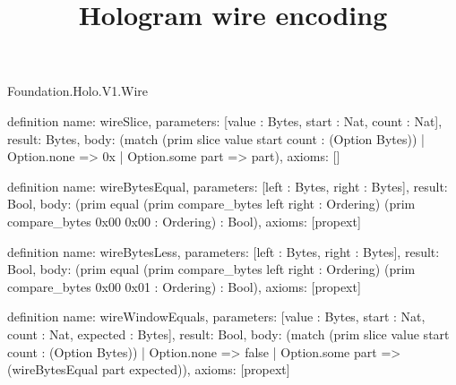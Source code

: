 \begin{lexlean}{Foundation.Holo.V1.Wire}
\title{Hologram wire encoding}
\begin{semanticmodule}
definition{
  name: wireSlice,
  parameters: [value : Bytes, start : Nat, count : Nat],
  result: Bytes,
  body: (match (prim slice value start count : (Option Bytes))
    | Option.none => 0x
    | Option.some part => part),
  axioms: []
}

definition{
  name: wireBytesEqual,
  parameters: [left : Bytes, right : Bytes],
  result: Bool,
  body: (prim equal (prim compare_bytes left right : Ordering) (prim compare_bytes 0x00 0x00 : Ordering) : Bool),
  axioms: [propext]
}

definition{
  name: wireBytesLess,
  parameters: [left : Bytes, right : Bytes],
  result: Bool,
  body: (prim equal (prim compare_bytes left right : Ordering) (prim compare_bytes 0x00 0x01 : Ordering) : Bool),
  axioms: [propext]
}

definition{
  name: wireWindowEquals,
  parameters: [value : Bytes, start : Nat, count : Nat, expected : Bytes],
  result: Bool,
  body: (match (prim slice value start count : (Option Bytes))
    | Option.none => false
    | Option.some part => (wireBytesEqual part expected)),
  axioms: [propext]
}


\end{semanticmodule}
\end{lexlean}
